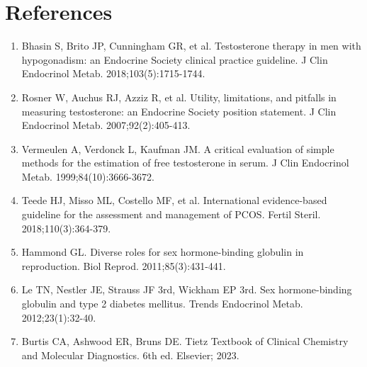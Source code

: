 \section*{References}
\begin{enumerate}
  \item Bhasin S, Brito JP, Cunningham GR, et al. Testosterone therapy in men with hypogonadism: an Endocrine Society clinical practice guideline. J Clin Endocrinol Metab. 2018;103(5):1715-1744.
  \item Rosner W, Auchus RJ, Azziz R, et al. Utility, limitations, and pitfalls in measuring testosterone: an Endocrine Society position statement. J Clin Endocrinol Metab. 2007;92(2):405-413.
  \item Vermeulen A, Verdonck L, Kaufman JM. A critical evaluation of simple methods for the estimation of free testosterone in serum. J Clin Endocrinol Metab. 1999;84(10):3666-3672.
  \item Teede HJ, Misso ML, Costello MF, et al. International evidence-based guideline for the assessment and management of PCOS. Fertil Steril. 2018;110(3):364-379.
  \item Hammond GL. Diverse roles for sex hormone-binding globulin in reproduction. Biol Reprod. 2011;85(3):431-441.
  \item Le TN, Nestler JE, Strauss JF 3rd, Wickham EP 3rd. Sex hormone-binding globulin and type 2 diabetes mellitus. Trends Endocrinol Metab. 2012;23(1):32-40.
  \item Burtis CA, Ashwood ER, Bruns DE. Tietz Textbook of Clinical Chemistry and Molecular Diagnostics. 6th ed. Elsevier; 2023.
\end{enumerate}

\clearpage
